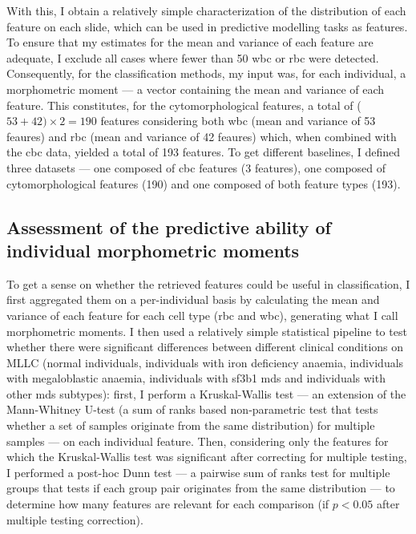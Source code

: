 With this, I obtain a relatively simple characterization of the distribution of each feature on each slide, which can be used in predictive modelling tasks as features. To ensure that my estimates for the mean and variance of each feature are adequate, I exclude all cases where fewer than 50 \ac{wbc} or \ac{rbc} were detected. Consequently, for the classification methods, my input was, for each individual, a morphometric moment --- a vector containing the mean and variance of each feature. This constitutes, for the cytomorphological features, a total of ($53 + 42) \times 2 = 190$ features considering both \ac{wbc} (mean and variance of 53 feaures) and \ac{rbc} (mean and variance of 42 feaures) which, when combined with the \ac{cbc} data, yielded a total of 193 features. To get different baselines, I defined three datasets --- one composed of \ac{cbc} features (3 features), one composed of cytomorphological features (190) and one composed of both feature types (193). 

\subsection{Assessment of the predictive ability of individual morphometric moments}

To get a sense on whether the retrieved features could be useful in classification, I first aggregated them on a per-individual basis by calculating the mean and variance of each feature for each cell type (\ac{rbc} and \ac{wbc}), generating what I call morphometric moments. I then used a relatively simple statistical pipeline to test whether there were significant differences between different clinical conditions on MLLC (normal individuals, individuals with iron deficiency anaemia, individuals with megaloblastic anaemia, individuals with \ac{sf3b1} \ac{mds} and individuals with other \ac{mds} subtypes): first, I perform a Kruskal-Wallis test --- an extension of the Mann-Whitney U-test (a sum of ranks based non-parametric test that tests whether a set of samples originate from the same distribution) for multiple samples --- on each individual feature. Then, considering only the features for which the Kruskal-Wallis test was significant after correcting for multiple testing, I performed a post-hoc Dunn test --- a pairwise sum of ranks test for multiple groups that tests if each group pair originates from the same distribution --- to determine how many features are relevant for each comparison (if $p<0.05$ after multiple testing correction).

